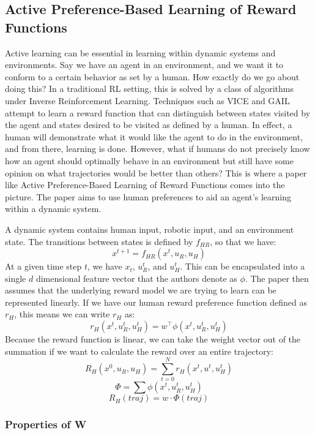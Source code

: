 \documentclass[
  letterpaper,
  DIV=11,
  numbers=noendperiod,
  oneside]{scrreprt}
\theoremstyle{remark}
\begin{document}
\subsection{Active Preference-Based Learning of Reward
Functions}\label{active-preference-based-learning-of-reward-functions}

Active learning can be essential in learning within dynamic systems and
environments. Say we have an agent in an environment, and we want it to
conform to a certain behavior as set by a human. How exactly do we go
about doing this? In a traditional RL setting, this is solved by a class
of algorithms under Inverse Reinforcement Learning. Techniques such as
VICE and GAIL attempt to learn a reward function that can distinguish
between states visited by the agent and states desired to be visited as
defined by a human. In effect, a human will demonstrate what it would
like the agent to do in the environment, and from there, learning is
done. However, what if humans do not precisely know how an agent should
optimally behave in an environment but still have some opinion on what
trajectories would be better than others? This is where a paper like
Active Preference-Based Learning of Reward Functions comes into the
picture. The paper aims to use human preferences to aid an agent's
learning within a dynamic system.

A dynamic system contains human input, robotic input, and an environment
state. The transitions between states is defined by \(f_{HR}\), so that
we have: \[x^{t+1} = f_{HR}(x^t, u_R, u_H)\] At a given time step \(t\),
we have \(x_t\), \(u_R^t\), and \(u_H^t\). This can be encapsulated into
a single \(d\) dimensional feature vector that the authors denote as
\(\phi\). The paper then assumes that the underlying reward model we are
trying to learn can be represented linearly. If we have our human reward
preference function defined as \(r_H\), this means we can write \(r_H\)
as: \[r_H(x^t, u_R^t, u_H^t) = w^{\intercal}\phi(x^t, u_R^t, u_H^t)\]
Because the reward function is linear, we can take the weight vector out
of the summation if we want to calculate the reward over an entire
trajectory:
\[R_{H}(x^0, u_R, u_H) = \sum_{t=0}^{N} r_{H}(x^t, u^t, u_H^t)\]
\[\Phi = \sum \phi(x^t, u_R^t, u_H^t)\] \[R_H(traj) = w\cdot\Phi(traj)\]

\subsubsection{Properties of W}\label{properties-of-w}
\end{document}
